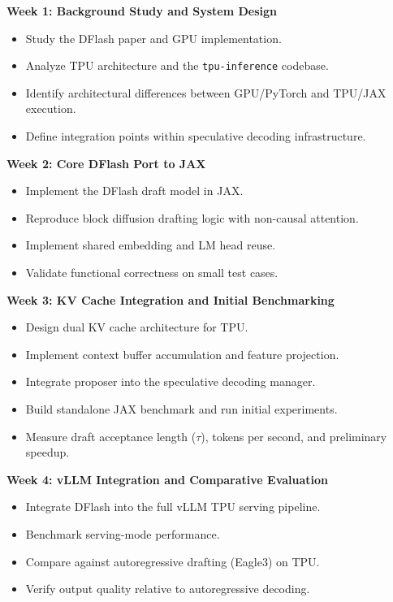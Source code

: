 \documentclass[12pt,letterpaper]{article}
\begin{document}
\textbf{Week 1: Background Study and System Design}

\begin{itemize}
    \item Study the DFlash paper and GPU implementation.
    \item Analyze TPU architecture and the \texttt{tpu-inference} codebase.
    \item Identify architectural differences between GPU/PyTorch and TPU/JAX execution.
    \item Define integration points within speculative decoding infrastructure.
\end{itemize}

\textbf{Week 2: Core DFlash Port to JAX}

\begin{itemize}
    \item Implement the DFlash draft model in JAX.
    \item Reproduce block diffusion drafting logic with non-causal attention.
    \item Implement shared embedding and LM head reuse.
    \item Validate functional correctness on small test cases.
\end{itemize}

\textbf{Week 3: KV Cache Integration and Initial Benchmarking}

\begin{itemize}
    \item Design dual KV cache architecture for TPU.
    \item Implement context buffer accumulation and feature projection.
    \item Integrate proposer into the speculative decoding manager.
    \item Build standalone JAX benchmark and run initial experiments.
    \item Measure draft acceptance length ($\tau$), tokens per second, and preliminary speedup.
\end{itemize}

\textbf{Week 4: vLLM Integration and Comparative Evaluation}

\begin{itemize}
    \item Integrate DFlash into the full vLLM TPU serving pipeline.
    \item Benchmark serving-mode performance.
    \item Compare against autoregressive drafting (Eagle3) on TPU.
    \item Verify output quality relative to autoregressive decoding.
\end{itemize}
\end{document}
